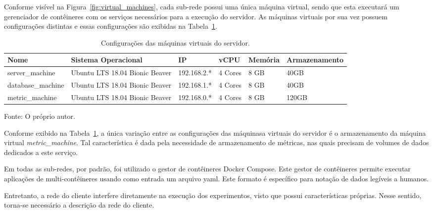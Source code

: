 Conforme visível na Figura~\ref{fig:virtual_machines}, cada sub-rede possui uma única máquina virtual, sendo que esta executará um gerenciador de contêineres com os serviços necessários para a execução do servidor.
%
As máquinas virtuais por sua vez possuem configurações distintas e essas configurações são exibidas na Tabela~\ref{tab:configuracao_das_maquinas}.



\begin{table}[htb!]
\centering
\begin{adjustbox}{max width=\textwidth}
\caption{Configurações das máquinas virtuais do servidor.}
\label{tab:configuracao_das_maquinas}
\begin{tabular}{|l|l|l|l|l|l|}
\hline
Nome              & Sistema Operacional            & IP          & vCPU    & Memória & Armazenamento \\ \hline
server\_machine   & Ubuntu LTS 18.04 Bionic Beaver & 192.168.2.* & 4 Cores & 8 GB    & 40GB          \\ \hline
database\_machine & Ubuntu LTS 18.04 Bionic Beaver & 192.168.1.* & 4 Cores & 8 GB    & 40GB          \\ \hline
metric\_machine   & Ubuntu LTS 18.04 Bionic Beaver & 192.168.0.* & 4 Cores & 8 GB    & 120GB         \\ \hline
\end{tabular}
\end{adjustbox}

Fonte: O próprio autor.
\end{table}



Conforme exibido na Tabela~\ref{tab:configuracao_das_maquinas}, a única variação entre as configurações das máquinasa virtuais do servidor é o armazenamento da máquina virtual \textit{metric\_machine}.
%
Tal característica é dada pela necessidade de armazenamento de métricas, nas quais precisam de volumes de dados dedicados a este serviço.



Em todas as sub-redes, por padrão, foi utilizado o gestor de contêineres Docker Compose.
%
Este gestor de contêineres permite executar aplicações de multi-contêineres usando como entrada um arquivo \ac{yaml}.
%
Este formato é específico para notação de dados legíveis a humanos.



Entretanto, a rede do cliente interfere diretamente na execução dos experimentos, visto que possui características próprias.
%
Nesse sentido, torna-se necessário a descrição da rede do cliente.

